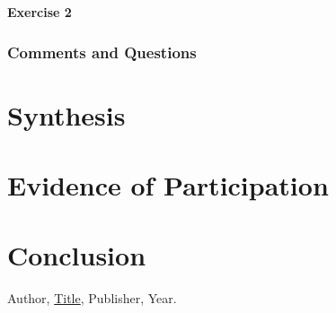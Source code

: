 \documentclass{article}
\theoremstyle{theorem}
\theoremstyle{definition}
\theoremstyle{remark}
\begin{document}
\textbf{Exercise 2}


\subsubsection*{Comments and Questions}

\section{Synthesis}

\section{Evidence of Participation}

\section{Conclusion}\label{conclusion}

\begin{thebibliography}{99}
 Author, \href{https://en.wikipedia.org/wiki/LaTeX}{Title}, Publisher, Year.
\end{thebibliography}
\end{document}
